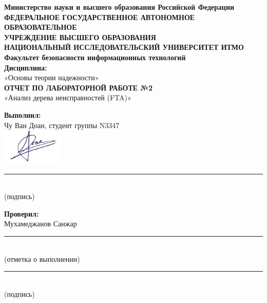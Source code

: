 \documentclass[a4paper,12pt]{article}
\begin{document}
	
	\thispagestyle{empty} %
	
	\onehalfspacing %
	
	\begin{center}
		\textbf{Министерство науки и высшего образования Российской Федерации} \\
		\textbf{ФЕДЕРАЛЬНОЕ ГОСУДАРСТВЕННОЕ АВТОНОМНОЕ ОБРАЗОВАТЕЛЬНОЕ} \\
		\textbf{УЧРЕЖДЕНИЕ ВЫСШЕГО ОБРАЗОВАНИЯ} \\
		\textbf{НАЦИОНАЛЬНЫЙ ИССЛЕДОВАТЕЛЬСКИЙ УНИВЕРСИТЕТ ИТМО} \\
		\vspace{1cm}
		\textbf{Факультет безопасности информационных технологий} \\
		\vspace{0.5cm}
		\textbf{Дисциплина:} \\
		«Основы теории надежности» \\
		\vspace{1cm}
		\textbf{ОТЧЕТ ПО ЛАБОРАТОРНОЙ РАБОТЕ №2} \\
		«Анализ дерева неисправностей (FTA)» \\
	\end{center}
	
	\vspace{1.5cm} %
	
	\begin{flushright}
		\textbf{Выполнил:} \\
		Чу Ван Доан, студент группы N3347 \\
		
		\vspace{0.25cm} %
		\includegraphics[width=3cm]{chuky.png} %
		
		\rule{5cm}{0.4pt} \\ (подпись)
	\end{flushright}
	
	\begin{flushright}
		\textbf{Проверил:} \\
		Мухамеджанов Санжар \\
		
		\vspace{1cm}
		\rule{5cm}{0.4pt} \\ (отметка о выполнении) \\
		\vspace{0.5cm}
		\rule{5cm}{0.4pt} \\ (подпись)
	\end{flushright}
	
\end{document}
